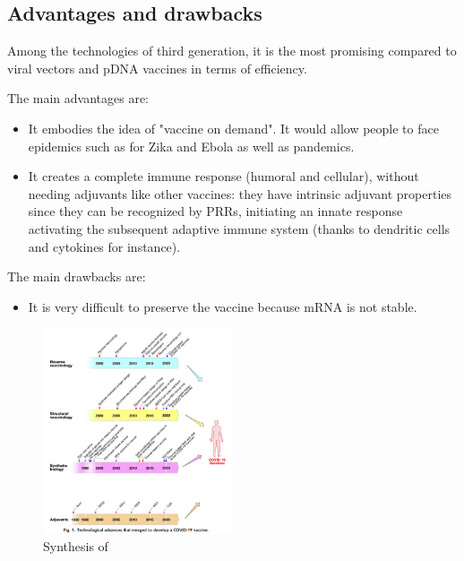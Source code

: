 \documentclass{article}
\begin{document}
        \subsection{Advantages and drawbacks}

            Among the technologies of third generation, it is the most promising compared to viral vectors and pDNA vaccines in terms of efficiency.

            The main advantages are:
            \begin{itemize}
                \item It embodies the idea of "vaccine on demand". It would allow people to face epidemics such as for Zika and Ebola as well as pandemics.
                \item It creates a complete immune response (humoral and cellular), without needing adjuvants like other vaccines:
                    they have intrinsic adjuvant properties since they can be recognized by PRRs, initiating an innate response activating
                    the subsequent adaptive immune system (thanks to dendritic cells and cytokines for instance).
            \end{itemize}

            The main drawbacks are:
            \begin{itemize}
                \item It is very difficult to preserve the vaccine because mRNA is not stable.
            \end{itemize}

            
            \begin{figure}
                \centering
                \includegraphics[width=0.5\textwidth]{imgs/Revolution.PNG}
                \caption{Synthesis of \autocite{rappuoliVaccinologyPostCOVID192021}}
                \label{fig:mRNAtypes}
            \end{figure}
\end{document}
